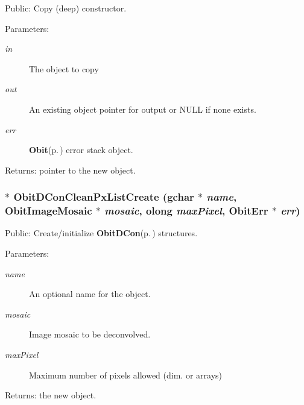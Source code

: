 Public: Copy (deep) constructor. 

\begin{Desc}
\item[Parameters:]
\begin{description}
\item[{\em in}]The object to copy \item[{\em out}]An existing object pointer for output or NULL if none exists. \item[{\em err}]{\bf Obit}{\rm (p.\,\pageref{structObit})} error stack object. \end{description}
\end{Desc}
\begin{Desc}
\item[Returns:]pointer to the new object. \end{Desc}
\subsubsection{$\ast$ Obit\-DCon\-Clean\-Px\-List\-Create (gchar $\ast$ {\em name}, {\bf Obit\-Image\-Mosaic} $\ast$ {\em mosaic}, {\bf olong} {\em max\-Pixel}, {\bf Obit\-Err} $\ast$ {\em err})}\label{ObitDConCleanPxList_8h_a16}


Public: Create/initialize {\bf Obit\-DCon}{\rm (p.\,\pageref{structObitDCon})} structures. 

\begin{Desc}
\item[Parameters:]
\begin{description}
\item[{\em name}]An optional name for the object. \item[{\em mosaic}]Image mosaic to be deconvolved. \item[{\em max\-Pixel}]Maximum number of pixels allowed (dim. or arrays) \end{description}
\end{Desc}
\begin{Desc}
\item[Returns:]the new object. \end{Desc}
